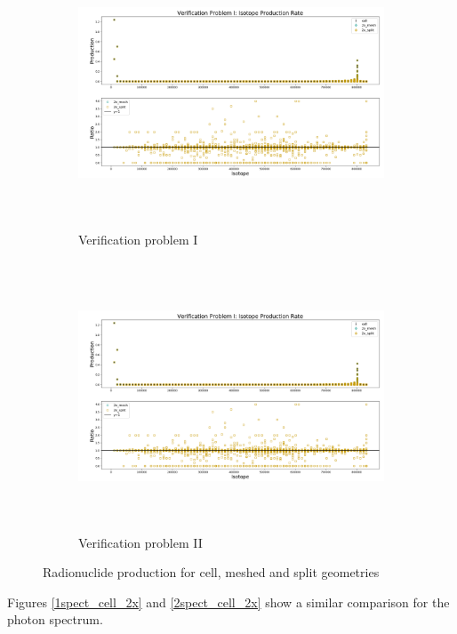 \begin{figure}[h!]
 \begin{centering}
 \centering
 \begin{subfigure}[b]{.8\textwidth}
 \includegraphics[width=0.99\linewidth,height=8cm]{../figs/toy_p1/prod_VPI_2x.png}
 \caption{Verification problem I }
 \label{1prod_cell_2x}
 \end{subfigure}
 \hspace{0.05cm}
 \begin{subfigure}[b]{.8\textwidth}
 \centering
 \includegraphics[width=.99\linewidth,height=8cm]{../figs/toy_p1/prod_VPI_2x.png}
 \caption{Verification problem II}
 \label{2prod_cell_2x}
 \end{subfigure}
 \caption{Radionuclide production for cell, meshed and split geometries}
 \label{prod_cell_2x}
 \end{centering}
\end{figure}
Figures \ref{1spect_cell_2x} and \ref{2spect_cell_2x} show a similar
comparison for the photon spectrum.\\
